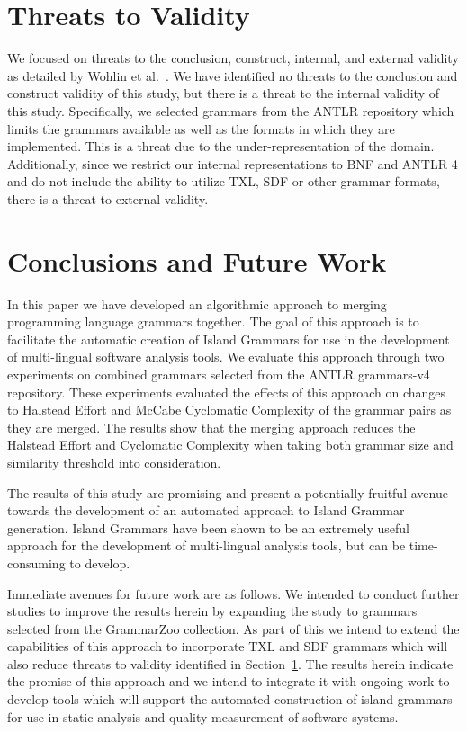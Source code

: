 \documentclass[conference]{IEEEtran}
\begin{document}
\hypertarget{sec:threats}{%
\section{Threats to Validity}\label{sec:threats}}

We focused on threats to the conclusion, construct, internal, and
external validity as detailed by Wohlin et
al.~\cite{wohlinExperimentationSoftwareEngineering2012}. We have
identified no threats to the conclusion and construct validity of this
study, but there is a threat to the internal validity of this study.
Specifically, we selected grammars from the ANTLR repository which
limits the grammars available as well as the formats in which they are
implemented. This is a threat due to the under-representation of the
domain. Additionally, since we restrict our internal representations to
BNF and ANTLR 4 and do not include the ability to utilize TXL, SDF or
other grammar formats, there is a threat to external validity.

\hypertarget{sec:conclusions}{%
\section{Conclusions and Future Work}\label{sec:conclusions}}

In this paper we have developed an algorithmic approach to merging
programming language grammars together. The goal of this approach is to
facilitate the automatic creation of Island Grammars for use in the
development of multi-lingual software analysis tools. We evaluate this
approach through two experiments on combined grammars selected from the
ANTLR grammars-v4 repository. These experiments evaluated the effects of
this approach on changes to Halstead Effort and McCabe Cyclomatic
Complexity of the grammar pairs as they are merged. The results show
that the merging approach reduces the Halstead Effort and Cyclomatic
Complexity when taking both grammar size and similarity threshold into
consideration.

The results of this study are promising and present a potentially
fruitful avenue towards the development of an automated approach to
Island Grammar generation. Island Grammars have been shown to be an
extremely useful approach for the development of multi-lingual analysis
tools, but can be time-consuming to develop.

Immediate avenues for future work are as follows. We intended to conduct
further studies to improve the results herein by expanding the study to
grammars selected from the GrammarZoo \cite{zaytsevGrammarZooCorpus2015}
collection. As part of this we intend to extend the capabilities of this
approach to incorporate TXL and SDF grammars which will also reduce
threats to validity identified in Section~\ref{sec:threats}. The results
herein indicate the promise of this approach and we intend to integrate
it with ongoing work to develop tools which will support the automated
construction of island grammars for use in static analysis and quality
measurement of software systems.
\end{document}
